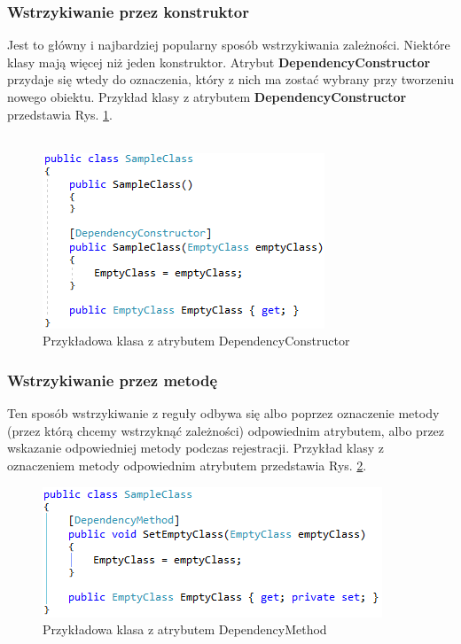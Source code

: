 \documentclass[12pt]{article}
\begin{document}
\subsubsection{Wstrzykiwanie przez konstruktor}
Jest to główny i najbardziej popularny sposób wstrzykiwania zależności. Niektóre klasy mają więcej niż jeden konstruktor. Atrybut \textbf{DependencyConstructor} przydaje się wtedy do oznaczenia, który z nich ma zostać wybrany przy tworzeniu nowego obiektu. Przykład klasy z atrybutem \textbf{DependencyConstructor} przedstawia Rys. \ref{fig:DependencyConstructor}.\\ \\
\begin{figure}[H]
	\begin{center}
  		\includegraphics{DependencyConstructor.png}
  		\caption{Przykładowa klasa z atrybutem DependencyConstructor}
  		\label{fig:DependencyConstructor}
	\end{center}
\end{figure}

\subsubsection{Wstrzykiwanie przez metodę}
Ten sposób wstrzykiwanie z reguły odbywa się albo poprzez oznaczenie metody (przez którą chcemy wstrzyknąć zależności) odpowiednim atrybutem, albo przez wskazanie odpowiedniej metody podczas rejestracji. Przykład klasy z oznaczeniem metody odpowiednim atrybutem przedstawia Rys. \ref{fig:DependencyMethod}.
\begin{figure}[H]
	\begin{center}
  		\includegraphics{DependencyMethod.png}
  		\caption{Przykładowa klasa z atrybutem DependencyMethod}
  		\label{fig:DependencyMethod}
	\end{center}
\end{figure}
\end{document}
